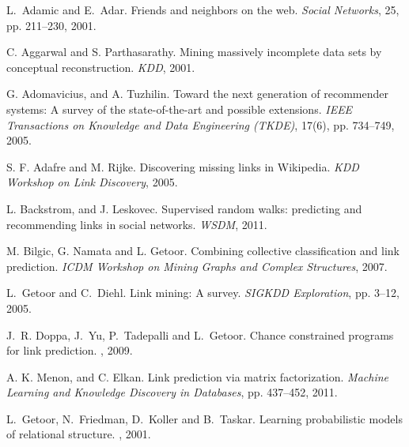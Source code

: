 \documentclass[10pt,journal,compsoc]{IEEEtran}
\begin{document}
%
%
%
\begin{thebibliography}{1}

L.~Adamic and E.~Adar. Friends and neighbors on the web. {\em
Social Networks}, 25, pp. 211--230, 2001.

 C. Aggarwal and S. Parthasarathy. Mining
massively incomplete data sets by conceptual reconstruction. {\em
KDD}, 2001.

 G. Adomavicius, and A. Tuzhilin.
Toward the next generation of recommender systems: A survey of the
state-of-the-art
 and possible extensions. {\em IEEE Transactions on Knowledge and Data Engineering (TKDE)},
 17(6), pp. 734--749, 2005.

S. F. Adafre and M.  Rijke. Discovering missing links in Wikipedia.
{\em KDD Workshop on Link Discovery}, 2005.


 L. Backstrom, and J. Leskovec.
 Supervised random walks: predicting and recommending
 links in social networks. {\em WSDM}, 2011.

M. Bilgic,  G. Namata and L. Getoor.  Combining collective
classification and link prediction. {\em ICDM Workshop on Mining
Graphs and Complex Structures}, 2007.


L.~Getoor and C.~Diehl. Link mining: A survey.
{\em SIGKDD Exploration}, pp. 3--12, 2005.


J.~R. Doppa, J.~Yu, P.~Tadepalli and L.~Getoor.
\newblock  Chance constrained programs for link prediction.
,
2009.

 A. K. Menon, and C. Elkan.
Link prediction via matrix factorization. {\em Machine Learning and
Knowledge Discovery in Databases}, pp. 437--452, 2011.

L.~Getoor, N.~Friedman, D.~Koller and B.~Taskar.
\newblock  Learning probabilistic models of relational
structure.
, 2001.


\end{thebibliography}
\end{document}
